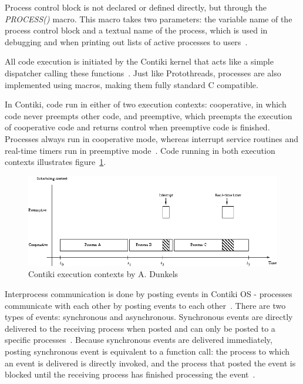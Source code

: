 Process control block is not declared or defined directly,
but through the {\it{PROCESS()}} macro.
This macro takes two parameters: the variable name of the process control block
and a textual name of the process,
which is used in debugging and when printing out lists of active processes to users~\cite{contiki-wiki-processes}.

All code execution is initiated by the Contiki kernel
that acts like a simple dispatcher calling these functions~\cite{contiki-docs}.
Just like Protothreads, processes are also implemented using macros,
making them fully standard C compatible.

In Contiki, code run in either of two execution contexts:
cooperative, in which code never preempts other code, and preemptive,
which preempts the execution of cooperative code and returns control
when preemptive code is finished.
Processes always run in cooperative mode,
whereas interrupt service routines and real-time timers run in preemptive mode~\cite{contiki-wiki-processes}.
Code running in both execution contexts illustrates figure~\ref{fig:contiki-execution-context}.

\begin{figure}
  \centering
  \includegraphics[width=13cm,keepaspectratio]{fig/Execution-contexts.png}
  \caption{Contiki execution contexts by A. Dunkels}
  \label{fig:contiki-execution-context}
\end{figure}

Interprocess communication is done by posting events in Contiki OS -
processes communicate with each other by posting events to each other~\cite{paper-contiki}.
There are two types of events: synchronous and asynchronous.
Synchronous events are directly delivered to the receiving process when posted and
can only be posted to a specific processes~\cite{contiki-wiki-processes}.
Because synchronous events are delivered immediately,
posting synchronous event is equivalent to a function call:
the process to which an event is delivered is directly invoked,
and the process that posted the event is blocked
until the receiving process has finished processing the event~\cite{contiki-wiki-processes}.

